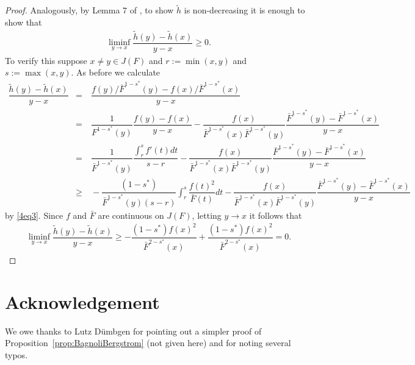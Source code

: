 \documentclass[11pt]{amsart}
\numberwithin{equation}{section}
\theoremstyle{definition}\newtheorem{definition}{Definition}
\theoremstyle{remark}\newtheorem{assumption}{Assumption}
\theoremstyle{remark}\newtheorem{remark}{Remark}
\theoremstyle{definition}\newtheorem{example}{Example}
\theoremstyle{plain}\newtheorem{question}{Question}
\theoremstyle{plain}\newtheorem{theorem}{Theorem}
\theoremstyle{plain}\newtheorem{lemma}{Lemma}
\theoremstyle{plain}\newtheorem{proposition}{Proposition}
\theoremstyle{plain}\newtheorem{corollary}{Corollary}
\theoremstyle{plain}\newtheorem{conjecture}{Conjecture}
\begin{document}
\begin{proof}
 Analogously, by Lemma $7$ of \cite{DuembgenKW:2017}, to show $\tilde{h}$ is non-decreasing it is enough to show that
 \begin{eqnarray*}
 \liminf_{y\to x}\dfrac{\tilde{h}(y)-\tilde{h}(x)}{y-x}\geq 0.
 \end{eqnarray*}
 To verify this suppose $x\neq y\in J(F)$ and $r:=\min(x,y)$ and $s:=\max(x,y)$. 
 As before we calculate
 \begin{eqnarray*}
    \dfrac{\tilde{h}(y)-\tilde{h}(x)}{y-x}
 & = &\  \dfrac{f(y)/\bar{F}^{1-s^*}(y)-f(x)/\bar{F}^{1-s^*}(x)}{y-x}\\
 & = &\  \dfrac{1}{F^{1-s^*}(y)}\dfrac{f(y)-f(x)}{y-x}-\dfrac{f(x)}{\bar{F}^{1-s^*}(x)\bar{F}^{1-s^*}(y)}
              \dfrac{\bar{F}^{1-s^*}(y)-\bar{F}^{1-s^*}(x)}{y-x}\\
 & = &\  \dfrac{1}{\bar{F}^{1-s^*}(y)}\dfrac{\int_{r}^{s}f'(t)dt}{s-r}-\dfrac{f(x)}{\bar{F}^{1-s^*}(x)\bar{F}^{1-s^*}(y)}
              \dfrac{\bar{F}^{1-s^*}(y)-\bar{F}^{1-s^*}(x)}{y-x}\\
 & \geq & \  - \dfrac{(1-s^*)}{\bar{F}^{1-s^*}(y)(s-r)}\int_{r}^{s}\dfrac{f(t)^2}{\bar{F}(t)}dt 
            -\dfrac{f(x)}{\bar{F}^{1-s^*}(x)\bar{F}^{1-s^*}(y)}\dfrac{\bar{F}^{1-s^*}(y)-\bar{F}^{1-s^*}(x)}{y-x}
 \end{eqnarray*}
 by \eqref{4eq3}. Since $f$ and $\bar{F}$ are continuous on $J(F)$,  letting $y\to x$ it follows that
\begin{eqnarray*}
    \liminf_{y\to x}\dfrac{\tilde{h}(y)-\tilde{h}(x)}{y-x} 
       \geq  -\dfrac{(1-s^*)f(x)^2}{\bar{F}^{2-s^*}(x)}+\dfrac{(1-s^*)f(x)^2}{\bar{F}^{2-s^*}(x)}=0 .
\end{eqnarray*}
\end{proof}
\medskip

\par\noindent
\section*{Acknowledgement}  
We owe thanks to Lutz D\"umbgen for pointing out a simpler proof of Proposition~\ref{prop:BagnoliBergstrom}
(not given here) and for noting several typos.  


 
 



\end{document}
